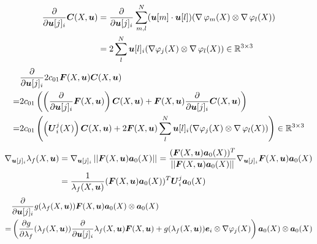 \begin{align*}
	\d{}{\vu[j]_i}\vC(X,\vu) &= \d{}{\vu[j]_i}\suml{m,l}{N} (\vu[m] \cdot \vu[l])(\divergence\varphi_m(X) \otimes \divergence\varphi_l(X))\\
	&= 2\suml{l}{N} \vu[l]_i(\dpj \otimes \divergence\varphi_l(X))\in\R^{3\times 3}
\end{align*}
\begin{align*}
	&\d{}{\vu[j]_i}2c_{01}\vF(X,\vu)\vC(X,\vu)\\
	=& 2c_{01}\left(\left(\d{}{\vu[j]_i}\vF(X,\vu)\right)\vC(X,\vu) + \vF(X,\vu)\d{}{\vu[j]_i}\vC(X,\vu)\right)\\
	=& 2c_{01}\left(\left(\vU^j_i(X)\right)\vC(X,\vu)
	+ 2\vF(X,\vu)\suml{l}{N} \vu[l]_i(\dpj \otimes \divergence\varphi_l(X))\right)\in\R^{3\times 3}
\end{align*}
\begin{align*}
	\nabla_{\vu[j]_i}\lambda_f(X,\vu) &= \nabla_{\vu[j]_i}\no{\vF(X,\vu)\va_0(X)} = \frac{(\vF(X,\vu)\va_0(X))^T}{\no{\vF(X,\vu)\va_0(X)}}\nabla_{\vu[j]_i}\vF(X,\vu)\va_0(X)\\
	&= \frac{1}{\lambda_f(X,\vu)}(\vF(X,\vu)\va_0(X))^T\vU_i^j\va_0(X)
\end{align*}
\begin{align*}
	  & \d{}{\vu[j]_i} g(\lambda_f(X,\vu))\vF(X,\vu)\va_0(X)\otimes\va_0(X)\\
	 =& \left( \d{g}{\lambda_f}(\lambda_f(X,\vu))\d{}{\vu[j]_i}\lambda_f(X,\vu)\vF(X,\vu) + g(\lambda_f(X,\vu))\ve_i\otimes\dpj\right)\va_0(X)\otimes\va_0(X) 
\end{align*}
